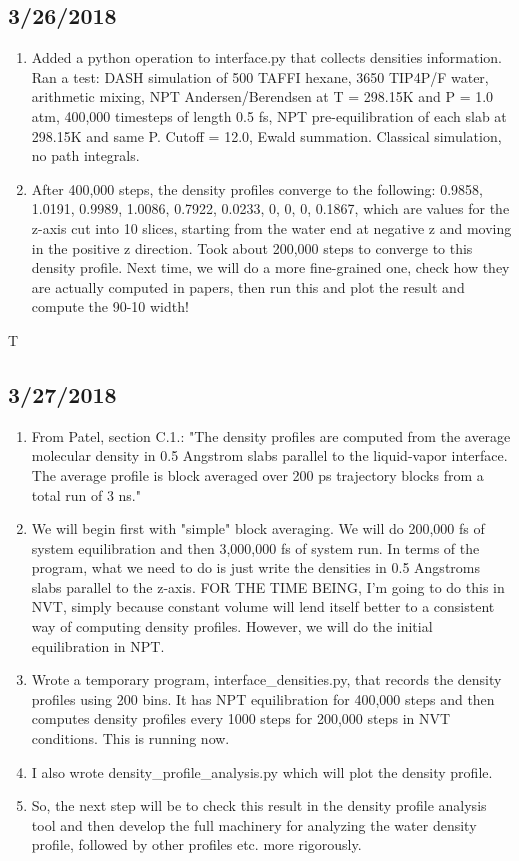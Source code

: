 \documentclass[12pt,reqno]{amsart}
\numberwithin{equation}{section}
\begin{document}
\begin{enumerate}
\end{enumerate}

\subsection{3/26/2018}
\begin{enumerate}
\item Added a python operation to interface.py that collects densities information.  Ran a test: DASH simulation of 500 TAFFI hexane, 3650 TIP4P/F water, arithmetic mixing, NPT Andersen/Berendsen at T = 298.15K and P = 1.0 atm, 400,000 timesteps of length 0.5 fs, NPT pre-equilibration of each slab at 298.15K and same P.  Cutoff = 12.0, Ewald summation.  Classical simulation, no path integrals.  
\item After 400,000 steps, the density profiles converge to the following: 0.9858, 1.0191, 0.9989, 1.0086, 0.7922, 0.0233, 0, 0, 0, 0.1867, which are values for the z-axis cut into 10 slices, starting from the water end at negative z and moving in the positive z direction.  Took about 200,000 steps to converge to this density profile.  Next time, we will do a more fine-grained one, check how they are actually computed in papers, then run this and plot the result and compute the 90-10 width! 
\end{enumerate}T

\subsection{3/27/2018}
\begin{enumerate}
\item From Patel, section C.1.: "The density profiles are computed from the average molecular density in 0.5 Angstrom slabs parallel to the liquid-vapor interface.  The average profile is block averaged over 200 ps trajectory blocks from a total run of 3 ns."  
\item We will begin first with "simple" block averaging.  We will do 200,000 fs of system equilibration and then 3,000,000 fs of system run.  In terms of the program, what we need to do is just write the densities in 0.5 Angstroms slabs parallel to the z-axis.  FOR THE TIME BEING, I'm going to do this in NVT, simply because constant volume will lend itself better to a consistent way of computing density profiles.  However, we will do the initial equilibration in NPT.  
\item Wrote a temporary program, interface\_densities.py, that records the density profiles using 200 bins. It has NPT equilibration for 400,000 steps and then computes density profiles every 1000 steps for 200,000 steps in NVT conditions.  This is running now.
\item I also wrote density\_profile\_analysis.py which will plot the density profile. 
\item So, the next step will be to check this result in the density profile analysis tool and then develop the full machinery for analyzing the water density profile, followed by other profiles etc. more rigorously.  
\end{enumerate}
\end{document}
